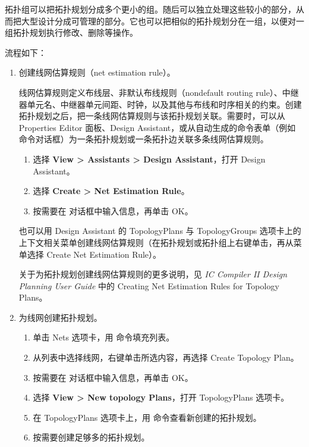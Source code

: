 拓扑组可以把拓扑规划分成多个更小的组。随后可以独立处理这些较小的部分，从而把大型设计分成可管理的部分。它也可以把相似的拓扑规划分在一组，以便对一组拓扑规划执行修改、删除等操作。

流程如下：
\begin{enumerate}
  \item 创建线网估算规则（net estimation rule）。

  线网估算规则定义布线层、非默认布线规则（nondefault routing rule）、中继器单元名、中继器单元间距、时钟，以及其他与布线和时序相关的约束。创建拓扑规划之后，把一条线网估算规则与该拓扑规划关联。需要时，可以从 Properties Editor 面板、Design Assistant，或从自动生成的命令表单（例如  命令对话框）为一条拓扑规划或一条拓扑边关联多条线网估算规则。
  \begin{enumerate}[label=\alph*.]
    \item 选择 \textbf{View > Assistants > Design Assistant}，打开 Design Assistant。
    \item 选择 \textbf{Create > Net Estimation Rule}。
    \item 按需要在  对话框中输入信息，再单击 OK。
  \end{enumerate}

  也可以用 Design Assistant 的 TopologyPlans 与 TopologyGroups 选项卡上的上下文相关菜单创建线网估算规则（在拓扑规划或拓扑组上右键单击，再从菜单选择 Create Net Estimation Rule）。

  \begin{seeAlsoBox}
  关于为拓扑规划创建线网估算规则的更多说明，见 \emph{IC Compiler II Design Planning User Guide} 中的 Creating Net Estimation Rules for Topology Plans。
  \end{seeAlsoBox}

  \item 为线网创建拓扑规划。
  \begin{enumerate}[label=\alph*.]
    \item 单击 Nets 选项卡，用  命令填充列表。
    \item 从列表中选择线网，右键单击所选内容，再选择 Create Topology Plan。
    \item 按需要在  对话框中输入信息，再单击 OK。
    \item 选择 \textbf{View > New topology Plans}，打开 TopologyPlans 选项卡。
    \item 在 TopologyPlans 选项卡上，用  命令查看新创建的拓扑规划。
    \item 按需要创建足够多的拓扑规划。
  \end{enumerate}


\end{enumerate}
